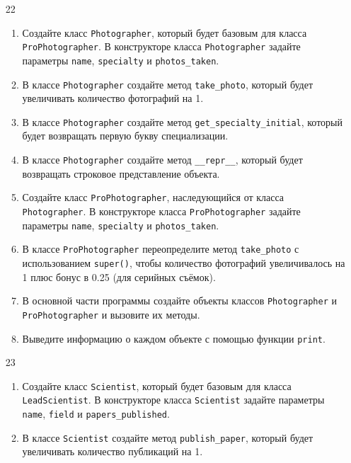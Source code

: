 \begin{enumerate}
\item[22] 
\begin{enumerate}[leftmargin=*]
    \item Создайте класс \texttt{Photographer}, который будет базовым для класса \texttt{ProPhotographer}. В конструкторе класса \texttt{Photographer} задайте параметры \texttt{name}, \texttt{specialty} и \texttt{photos\_taken}.
    
    \item В классе \texttt{Photographer} создайте метод \texttt{take\_photo}, который будет увеличивать количество фотографий на 1.
    
    \item В классе \texttt{Photographer} создайте метод \texttt{get\_specialty\_initial}, который будет возвращать первую букву специализации.
    
    \item В классе \texttt{Photographer} создайте метод \texttt{\_\_repr\_\_}, который будет возвращать строковое представление объекта.
    
    \item Создайте класс \texttt{ProPhotographer}, наследующийся от класса \texttt{Photographer}. В конструкторе класса \texttt{ProPhotographer} задайте параметры \texttt{name}, \texttt{specialty} и \texttt{photos\_taken}.
    
    \item В классе \texttt{ProPhotographer} переопределите метод \texttt{take\_photo} с использованием \texttt{super()}, чтобы количество фотографий увеличивалось на 1 плюс бонус в 0.25 (для серийных съёмок).
    
    \item В основной части программы создайте объекты классов \texttt{Photographer} и \texttt{ProPhotographer} и вызовите их методы.
    
    \item Выведите информацию о каждом объекте с помощью функции \texttt{print}.
\end{enumerate}

\item[23] 
\begin{enumerate}[leftmargin=*]
    \item Создайте класс \texttt{Scientist}, который будет базовым для класса \texttt{LeadScientist}. В конструкторе класса \texttt{Scientist} задайте параметры \texttt{name}, \texttt{field} и \texttt{papers\_published}.
    
    \item В классе \texttt{Scientist} создайте метод \texttt{publish\_paper}, который будет увеличивать количество публикаций на 1.
    

\end{enumerate}
\end{enumerate}
